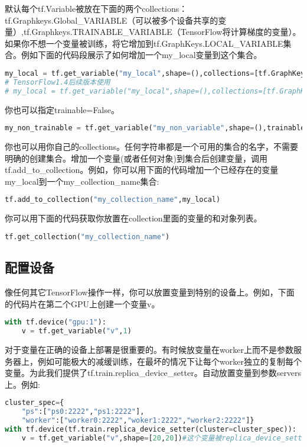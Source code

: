 默认每个tf.Variable被放在下面的两个collections：tf.Graphkeys.Global\_VARIABLE（可以被多个设备共享的变量）,tf.Graphkeys.TRAINABLE\_VARIABLE（TensorFlow将计算梯度的变量）。如果你不想一个变量被训练，将它增加到tf.GraphKeys.LOCAL\_VARIABLE集合。例如下面的代码段展示了如何增加一个my\_local变量到这个集合。
\begin{lstlisting}[language=Python]
my_local = tf.get_variable("my_local",shape=(),collections=[tf.GraphKeys.LOCAL_VARIABLES])
# TensorFlow1.4后续版本使用
# my_local = tf.get_variable("my_local",shape=(),collections=[tf.GraphKeys.GLOBAL_VARIABLES])
\end{lstlisting}
你也可以指定trainable=False。
\begin{lstlisting}[language=Python]
my_non_trainable = tf.get_variable("my_non_variable",shape=(),trainable=False)
\end{lstlisting}
你也可以用你自己的collections。任何字符串都是一个可用的集合的名字，不需要明确的创建集合。增加一个变量(或者任何对象)到集合后创建变量，调用tf.add\_to\_collection。例如，你可以用下面的代码增加一个已经存在的变量my\_local到一个my\_collection\_name集合:
\begin{lstlisting}[language=Python]
	tf.add_to_collection("my_collection_name",my_local)
\end{lstlisting}
你可以用下面的代码获取你放置在collection里面的变量的和对象列表。
\begin{lstlisting}[language=Python]
tf.get_collection("my_collection_name")
\end{lstlisting}
\subsection{配置设备}
像任何其它TensorFlow操作一样，你可以放置变量到特别的设备上。例如，下面的代码片在第二个GPU上创建一个变量v。
\begin{lstlisting}[language=Python]
with tf.device("gpu:1"):
    v = tf.get_variable("v",1)
\end{lstlisting}
对于变量在正确的设备上部署是很重要的。有时候放变量在worker上而不是参数服务器上，例如可能极大的减缓训练，在最坏的情况下让每个worker独立的复制每个变量。为此我们提供了tf.train.replica\_device\_setter。自动放置变量到参数servers上。例如:
\begin{lstlisting}[language=Python]
cluster_spec={
	"ps":["ps0:2222","ps1:2222"],
	"worker":["worker0:2222","woker1:2222","worker2:2222"]}
with tf.device(tf.train.replica_device_setter(cluster=cluster_spec)):
    v = tf.get_variable("v",shape=[20,20])#这个变量被replica_device_setter放置在参数server上
\end{lstlisting}

